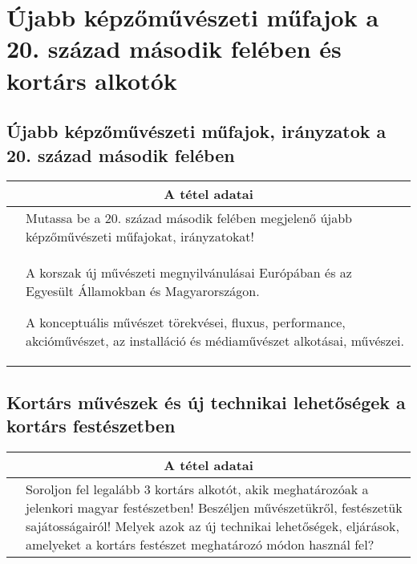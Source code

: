 \chapter{Újabb képzőművészeti műfajok a 20. század második felében és kortárs alkotók} %
\label{ch:20_uj_iranyzatok_20_szazad_vegen}

\section{Újabb képzőművészeti műfajok, irányzatok a 20. század második felében}

\begin{center}
	\begin{longtable}{ | p{} | p{} | }
		
		\hline
		\multicolumn{2}{|c|}{\textbf{A tétel adatai}}
		\\ \hline
		\hline
		
		\centering{Tétel teljes címe}
		&
		Mutassa be a 20. század második felében megjelenő újabb képzőművészeti műfajokat, irányzatokat!
		\\ \hline
		
		\centering{Jegyzetek}
		&
		\begin{compactitem}
			\item A korszak új művészeti megnyilvánulásai Európában és az Egyesült Államokban és Magyarországon.
			\item A konceptuális művészet törekvései, fluxus, performance, akcióművészet, az installáció és médiaművészet alkotásai, művészei.
		\end{compactitem}
		\\\hline
		
	\end{longtable}
\end{center}

\cleardoublepage


\section{Kortárs művészek és új technikai lehetőségek a kortárs festészetben}

\begin{center}
	\begin{longtable}{ | p{} | p{} | }
		
		\hline
		\multicolumn{2}{|c|}{\textbf{A tétel adatai}}
		\\ \hline
		\hline
		
		\centering{Tétel teljes címe}
		&
		Soroljon fel legalább 3 kortárs alkotót, akik meghatározóak a jelenkori magyar festészetben! Beszéljen művészetükről, festészetük sajátosságairól! Melyek azok az új technikai lehetőségek, eljárások, amelyeket a kortárs festészet meghatározó módon használ fel?
		\\ \hline
		
	\end{longtable}
\end{center}
